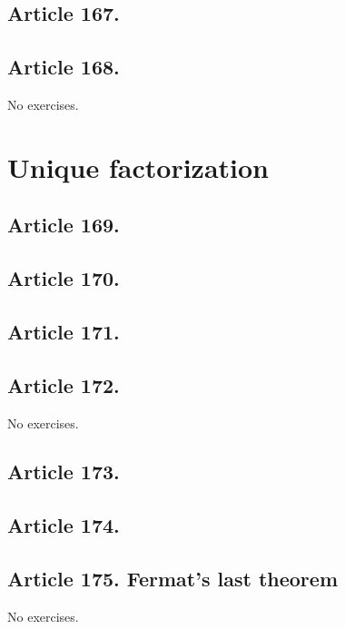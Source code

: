 \subsection{Article 167.}

\subsection{Article 168.}

No exercises.


\section{Unique factorization}


\subsection{Article 169.}

\subsection{Article 170.}

\subsection{Article 171.}

\subsection{Article 172.}

No exercises.
\subsection{Article 173.}

\subsection{Article 174.}

\subsection{Article 175. Fermat's last theorem}

No exercises.
